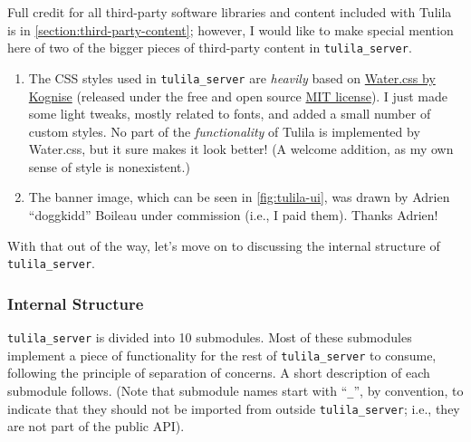 \documentclass[12pt]{article}
\begin{document}
Full credit for all third-party software libraries and content included with Tulila is in \cref{section:third-party-content}; however, I would like to make special mention here of two of the bigger pieces of third-party content in \texttt{tulila\_server}.

\begin{enumerate}
  \item The CSS styles used in \texttt{tulila\_server} are \textit{heavily} based on \href{https://watercss.kognise.dev/}{Water.css by Kognise} (released under the free and open source \href{https://github.com/kognise/water.css/blob/master/LICENSE.md}{MIT license}). I just made some light tweaks, mostly related to fonts, and added a small number of custom styles. No part of the \textit{functionality} of Tulila is implemented by Water.css, but it sure makes it look better! (A welcome addition, as my own sense of style is nonexistent.)
  \item The banner image, which can be seen in \cref{fig:tulila-ui}, was drawn by Adrien ``doggkidd'' Boileau under commission (i.e., I paid them). Thanks Adrien!
\end{enumerate}

With that out of the way, let's move on to discussing the internal structure of \texttt{tulila\_server}.

\subsubsection{Internal Structure}

\texttt{tulila\_server} is divided into 10 submodules. Most of these submodules implement a piece of functionality for the rest of \texttt{tulila\_server} to consume, following the principle of separation of concerns. A short description of each submodule follows. (Note that submodule names start with ``\texttt{\_}'', by convention, to indicate that they should not be imported from outside \texttt{tulila\_server}; i.e., they are not part of the public API).
\end{document}
